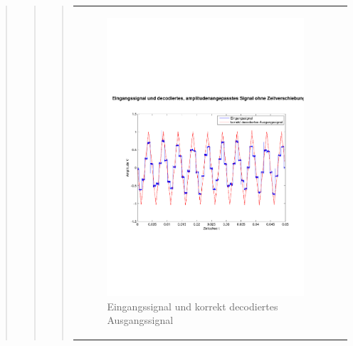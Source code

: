 \begin{quote}
\begin{quote}
\begin{quote}
\begin{center}
\begin{tabular}{ll}
                    \begin{minipage}{0.6\textwidth}
                        \begin{figure}[H]
                            \includegraphics[scale=0.4, trim = 0cm 7cm 0cm
                            7.5cm, clip]
                            {./Bilder/drei8_Eingang_vs_korrektDecodiert}
                              \caption{Eingangssignal und korrekt decodiertes
                              Ausgangssignal}
                        \end{figure}
                    \end{minipage}
                
                \end{tabular}
            \end{center}
            
            
            

\end{quote}
\end{quote}
\end{quote}
